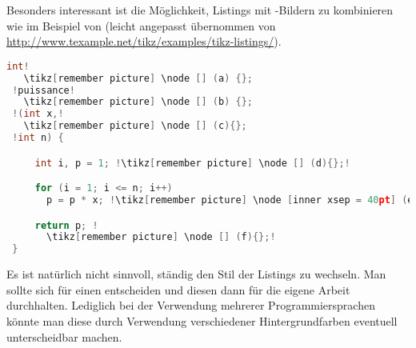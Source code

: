 Besonders interessant ist die Möglichkeit, Listings mit -Bildern zu kombinieren wie im Beispiel 
von 
(leicht angepasst übernommen von \url{http://www.texample.net/tikz/examples/tikz-listings/}).
%
\newpage
\phantom{xyz}\vspace{1cm}
%
\begin{lstlisting}[language = C++, numbers = none, escapechar = !,
    basicstyle = \ttfamily\bfseries, xleftmargin=.2\linewidth, xrightmargin=.2\linewidth,
    frame=tb, tabsize=1, framesep = 3pt, framerule =.4pt,
    backgroundcolor = \color{white}, caption=Ein Listing kombiniert mit \Paket{tikz}-Bild, label=lst:tikzfiglst] 
 int!
   \tikz[remember picture] \node [] (a) {};
 !puissance!
   \tikz[remember picture] \node [] (b) {};
 !(int x,!
   \tikz[remember picture] \node [] (c){};
 !int n) { 

     int i, p = 1; !\tikz[remember picture] \node [] (d){};!           

     for (i = 1; i <= n; i++) 
       p = p * x; !\tikz[remember picture] \node [inner xsep = 40pt] (e){};! 

     return p; !
       \tikz[remember picture] \node [] (f){};!  
 }
\end{lstlisting}
%
%
Es ist natürlich nicht sinnvoll, ständig den Stil der Listings zu wechseln. Man sollte sich für einen entscheiden
und diesen dann für die eigene Arbeit durchhalten. Lediglich bei der Verwendung mehrerer Programmiersprachen könnte
man diese durch Verwendung verschiedener Hintergrundfarben eventuell unterscheidbar machen.
%
